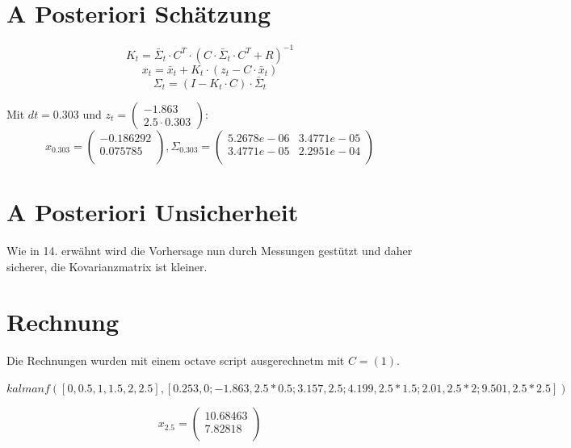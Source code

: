 \documentclass[12pt,a4paper]{article}
\begin{document}
\section{A Posteriori Schätzung}
\[
K_t = \bar{\Sigma}_t \cdot C^T \cdot (C \cdot \bar{\Sigma}_t \cdot C^T + R)^{-1}
\]
\[
x_t = \bar{x}_t + K_t \cdot (z_t - C \cdot \bar{x}_t)
\]
\[
\Sigma_t = (I - K_t \cdot C) \cdot \bar{\Sigma}_t
\]

Mit $dt = 0.303$ und $z_t = \begin{pmatrix}
-1.863 \\
2.5 \cdot 0.303
\end{pmatrix}$:
\[
x_{0.303} = \begin{pmatrix}
  -0.186292 \\ 0.075785\\
\end{pmatrix}, \Sigma_{0.303} = 
\begin{pmatrix}
   5.2678e-06  & 3.4771e-05\\
   3.4771e-05  & 2.2951e-04\\
\end{pmatrix}
\]

\section{A Posteriori Unsicherheit}
Wie in 14. erwähnt wird die Vorhersage nun durch Messungen gestützt und daher sicherer, die Kovarianzmatrix ist kleiner.

\section{Rechnung}
Die Rechnungen wurden mit einem octave script ausgerechnetm mit $C = (1)$.

$kalmanf([0, 0.5, 1,1.5,2,2.5], [0.253, 0; -1.863, 2.5*0.5; 3.157, 2.5; 4.199, 2.5*1.5; 2.01, 2.5*2;9.501, 2.5*2.5])$

\[
x_{2.5} = \begin{pmatrix}
   10.68463  \\  7.82818\\
\end{pmatrix}
\]
\end{document}
